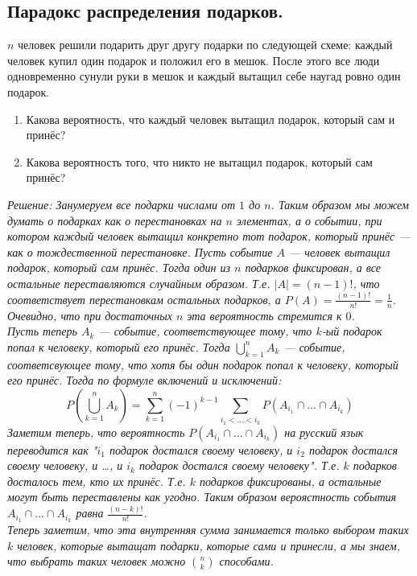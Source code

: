 \subsection{Парадокс распределения подарков.}
$n$ человек решили подарить друг другу подарки по следующей схеме: каждый человек купил один подарок и положил его в мешок.
После этого все люди одновременно сунули руки в мешок и каждый вытащил себе наугад ровно один подарок.
\begin{enumerate}
    \item Какова вероятность, что каждый человек вытащил подарок, который сам и принёс?
    \item Какова вероятность того, что никто не вытащил подарок, который сам принёс?
\end{enumerate}

\it{Решение:} Занумеруем все подарки числами от $1$ до $n$. Таким образом мы можем думать о подарках как о перестановках
на $n$ элементах, а о событии, при котором каждый человек вытащил конкретно тот подарок, который принёс --- как о
тождественной перестановке. Пусть событие $A$ --- человек вытащил подарок, который сам принёс. Тогда один из $n$
подарков фиксирован, а все остальные переставляются случайным образом. Т.е. $|A| = (n - 1)!$, что соответствует
перестановкам остальных подарков, а $P(A) = \frac{(n - 1)!}{n!} = \frac{1}{n}$. Очевидно, что при достаточных $n$ эта вероятность
стремится к $0$.\\
Пусть теперь $A_k$ --- событие, соответствующее тому, что $k$-ый подарок попал к человеку, который его принёс. Тогда
$\bigcup\limits_{k = 1}^n A_k$ --- событие, соответсвующее тому, что хотя бы один подарок попал к человеку, который его
принёс. Тогда по формуле включений и исключений:
\[
    P\left( \bigcup\limits_{k = 1}^n A_k \right) = \sum\limits_{k = 1}^n (-1)^{k - 1}
    \sum\limits_{i_1 < \ldots < i_k} P(A_{i_1} \cap \ldots \cap A_{i_k})
\]
Заметим теперь, что вероятность $P(A_{i_1} \cap \ldots \cap A_{i_k})$ на русский язык переводится как "$i_1$ подарок достался
своему человеку, и $i_2$ подарок достался своему человеку, и \ldots, и $i_k$ подарок достался своему человеку". Т.е. $k$ подарков
досталось тем, кто их принёс. Т.е. $k$ подарков фиксированы, а остальные могут быть переставлены как угодно. Таким образом
вероястность события $A_{i_1} \cap \ldots \cap A_{i_k}$ равна $\frac{(n - k)!}{n!}$.\\
Теперь заметим, что эта внутренняя сумма занимается только выбором таких $k$ человек, которые вытащат подарки, которые сами
и принесли, а мы знаем, что выбрать таких человек можно $\binom{n}{k}$ способами.\\
